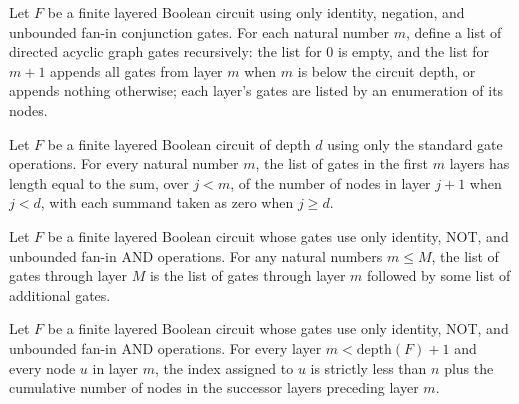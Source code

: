 \begin{definition}
\label{BoolCircuit.LayeredCircuit.gatesUpTo}
\leanok
{}
Let $F$ be a finite layered Boolean circuit using only identity, negation, and unbounded
fan-in conjunction gates. For each natural number $m$, define a list of directed acyclic
graph gates recursively: the list for $0$ is empty, and the list for $m+1$ appends all
gates from layer $m$ when $m$ is below the circuit depth, or appends nothing otherwise;
each layer’s gates are listed by an enumeration of its nodes.
\end{definition}

\begin{theorem}
\label{BoolCircuit.LayeredCircuit.length_gatesUpTo}
\leanok
{}
Let $F$ be a finite layered Boolean circuit of depth $d$ using only the standard gate
operations. For every natural number $m$, the list of gates in the first $m$ layers has
length equal to the sum, over $j<m$, of the number of nodes in layer $j+1$ when $j<d$,
with each summand taken as zero when $j\ge d$.
\end{theorem}

\begin{theorem}
\label{BoolCircuit.LayeredCircuit.gatesUpTo_mono}
\leanok
{}
Let $F$ be a finite layered Boolean circuit whose gates use only identity, NOT, and
unbounded fan-in AND operations. For any natural numbers $m\le M$, the list of gates
through layer $M$ is the list of gates through layer $m$ followed by some list of
additional gates.
\end{theorem}

\begin{theorem}
\label{BoolCircuit.LayeredCircuit.layerVertex_lt}
\leanok
{}
Let $F$ be a finite layered Boolean circuit whose gates use only identity, NOT, and
unbounded fan-in AND operations. For every layer $m<\mathrm{depth}(F)+1$ and every node
$u$ in layer $m$, the index assigned to $u$ is strictly less than $n$ plus the
cumulative number of nodes in the successor layers preceding layer $m$.
\end{theorem}

